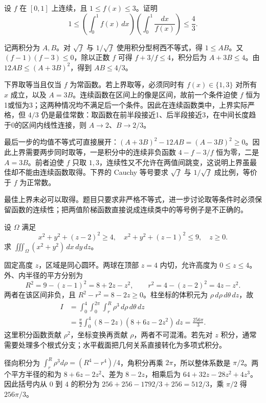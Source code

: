 \documentclass[12pt,fontset=fandol]{ctexart}
\begin{document}
\begin{example}\label{nm-2018-3}
设 $f$ 在 $[0,1]$ 上连续，且 $1\leq f(x)\leq3$。证明
\[
 1\leq\left(\int_0^1f(x)\,dx\right)
          \left(\int_0^1\frac{dx}{f(x)}\right)\leq\frac43.
\]
\end{example}
\begin{solve}
记两积分为 $A,B$。对 $\sqrt f$ 与 $1/\sqrt f$ 使用积分型柯西不等式，得 $1\leq AB$。又 $(f-1)(f-3)\leq0$，除以正数 $f$ 可得 $f+3/f\leq4$，积分后为 $A+3B\leq4$。由 $12AB\leq(A+3B)^2$，得到 $AB\leq4/3$。

下界取等当且仅当 $f$ 为常函数。若上界取等，必须同时有 $f(x)\in\{1,3\}$ 对所有 $x$ 成立，以及 $A=3B$。连续函数在区间上的像是区间，故前一个条件迫使 $f$ 恒为1或恒为3；这两种情况均不满足后一个条件。因此在连续函数类中，上界实际严格，但 $4/3$ 仍是最佳常数：取函数在前半段接近1、后半段接近3，在中间长度趋于0的区间内线性连接，则 $A\to2$、$B\to2/3$。

最后一步的均值不等式可直接展开：$(A+3B)^2-12AB=(A-3B)^2\ge0$。因此上界需要两步同时取等，一是积分中的连续非负函数 $4-f-3/f$ 恒为零，二是 $A=3B$。前者迫使 $f$ 只取 $1,3$，连续性又不允许在两值间跳变，这说明上界虽最佳却不能由连续函数取得。下界的 Cauchy 等号要求 $\sqrt f$ 与 $1/\sqrt f$ 成比例，等价于 $f$ 为正常数。

\end{solve}
\begin{remark}
最佳上界未必可以取得。题目只要求非严格不等式，进一步讨论取等条件时必须保留函数的连续性；把两值阶梯函数直接说成连续类中的等号例子是不正确的。
\end{remark}

\begin{example}\label{nm-2018-4}
设 $\Omega$ 满足
\[
 x^2+y^2+(z-2)^2\geq4,\quad
 x^2+y^2+(z-1)^2\leq9,\quad z\geq0.
\]
求 $\displaystyle\iiint_\Omega(x^2+y^2)\,dx\,dy\,dz$。
\end{example}
\begin{solve}
固定高度 $z$，区域是同心圆环。两球在顶部 $z=4$ 内切，允许高度为 $0\leq z\leq4$。外、内半径的平方分别为
\[
 R^2=9-(z-1)^2=8+2z-z^2,
 \qquad r^2=4-(z-2)^2=4z-z^2.
\]
两者在该区间非负，且 $R^2-r^2=8-2z\geq0$。柱坐标的体积元为 $\rho\,d\rho\,d\theta\,dz$，故
\begin{align*}
 I&=\int_0^4\int_0^{2\pi}\int_r^R\rho^3\,d\rho\,d\theta\,dz\\
 &=\frac\pi2\int_0^4(8-2z)(8+6z-2z^2)\,dz
 =\frac{256\pi}{3}.
\end{align*}
这里积分函数贡献 $\rho^2$，坐标变换再贡献 $\rho$，两者不可混淆。若先对 $z$ 积分，通常需要处理多个根式分支；水平截面把几何关系直接转化为多项式积分。

径向积分为 $\int_r^R\rho^3d\rho=(R^4-r^4)/4$，角积分再乘 $2\pi$，所以整体系数是 $\pi/2$。两个平方半径的和为 $8+6z-2z^2$、差为 $8-2z$，相乘后为 $64+32z-28z^2+4z^3$。因此括号内从 $0$ 到 $4$ 的积分为 $256+256-1792/3+256=512/3$，乘 $\pi/2$ 得 $256\pi/3$。

\end{solve}
\end{document}
